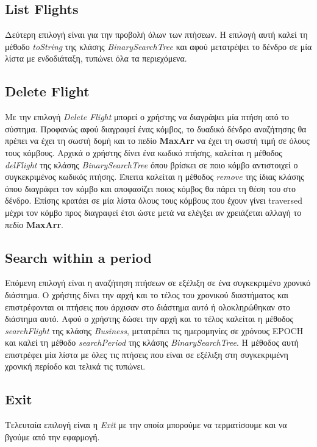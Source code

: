 \documentclass[a4paper]{article}
\begin{document}
\subsection{List Flights}
Δεύτερη επιλογή είναι για την προβολή όλων των πτήσεων. Η επιλογή αυτή καλεί τη
μέθοδο \emph{toString} της κλάσης \emph{BinarySearchTree} και αφού μετατρέψει το
δένδρο σε μία λίστα με ενδοδιάταξη, τυπώνει όλα τα περιεχόμενα.

\subsection{Delete Flight}
Με την επιλογή \emph{Delete Flight} μπορεί ο χρήστης να διαγράψει μία πτήση από
το σύστημα. Προφανώς αφού διαγραφεί ένας κόμβος, το δυαδικό δένδρο αναζήτησης θα
πρέπει να έχει τη σωστή δομή και το πεδίο \textbf{MaxArr} να έχει τη σωστή τιμή
σε όλους τους κόμβους. Αρχικά ο χρήστης δίνει ένα κωδικό πτήσης, καλείται η
μέθοδος \emph{delFlight} της κλάσης \emph{BinarySearchTree} όπου βρίσκει σε ποιο
κόμβο αντιστοιχεί ο συγκεκριμένος κωδικός πτήσης. Έπειτα καλείται η μέθοδος
\emph{remove} της ίδιας κλάσης όπου διαγράφει τον κόμβο και αποφασίζει ποιος
κόμβος θα πάρει τη θέση του στο δένδρο. Επίσης κρατάει σε μία λίστα όλους τους
κόμβους που έχουν γίνει traversed μέχρι τον κόμβο προς διαγραφεί έτσι ώστε μετά
να ελέγξει αν χρειάζεται αλλαγή το πεδίο \textbf{MaxArr}.

\subsection{Search within a period}
Επόμενη επιλογή είναι η αναζήτηση πτήσεων σε εξέλιξη σε ένα συγκεκριμένο χρονικό
διάστημα. Ο χρήστης δίνει την αρχή και το τέλος του χρονικού διαστήματος και
επιστρέφονται οι πτήσεις που άρχισαν στο διάστημα αυτό ή ολοκληρώθηκαν στο
διάστημα αυτό. Αφού ο χρήστης δώσει την αρχή και το τέλος καλείται η μέθοδος
\emph{searchFlight} της κλάσης \emph{Business}, μετατρέπει τις ημερομηνίες σε
χρόνους EPOCH και καλεί τη μέθοδο \emph{searchPeriod} της κλάσης
\emph{BinarySearchTree}. Η μέθοδος αυτή επιστρέφει μία λίστα με όλες τις πτήσεις
που είναι σε εξέλιξη στη συγκεκριμένη χρονική περίοδο και τελικά τις τυπώνει.

\subsection{Exit}
Τελευταία επιλογή είναι η \emph{Exit} με την οποία μπορούμε να τερματίσουμε και
να βγούμε από την εφαρμογή.
\end{document}
